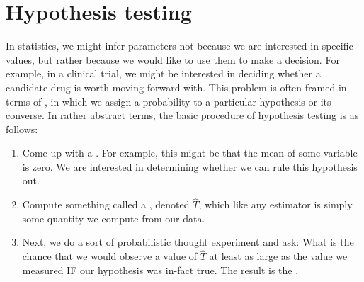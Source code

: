 \section{Hypothesis testing}
In statistics, we might infer parameters not because we are interested in specific values, but rather because we would like to use them to make a decision. For example, in a clinical trial, we might be interested in deciding whether a candidate drug is worth moving forward with. This problem is often framed in terms of , in which we assign a probability to a particular hypothesis or its converse. 
In rather abstract terms, the basic procedure of hypothesis testing is as follows:
\begin{enumerate}
\item Come up with a . For example, this might be that the mean of some variable is zero. We are interested in determining whether we can rule this hypothesis out. 
\item Compute something called a , denoted $\hat{T}$, which like any estimator is simply some quantity we compute from our data. 
\item Next, we do a sort of probabilistic thought experiment and ask: What is the chance that we would observe a value of $\hat{T}$ at least as large as the value we measured  IF our hypothesis was in-fact true.  The result is the . 
\end{enumerate}

